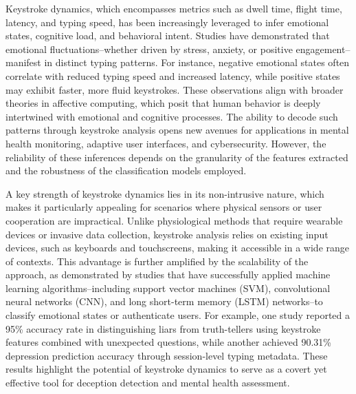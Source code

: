\documentclass[conference]{IEEEtran}
\begin{document}
Keystroke dynamics, which encompasses metrics such as dwell time, flight time, latency, and typing speed, has been increasingly leveraged to infer emotional states, cognitive load, and behavioral intent. Studies have demonstrated that emotional fluctuations--whether driven by stress, anxiety, or positive engagement--manifest in distinct typing patterns. For instance, negative emotional states often correlate with reduced typing speed and increased latency, while positive states may exhibit faster, more fluid keystrokes. These observations align with broader theories in affective computing, which posit that human behavior is deeply intertwined with emotional and cognitive processes. The ability to decode such patterns through keystroke analysis opens new avenues for applications in mental health monitoring, adaptive user interfaces, and cybersecurity. However, the reliability of these inferences depends on the granularity of the features extracted and the robustness of the classification models employed.  

A key strength of keystroke dynamics lies in its non-intrusive nature, which makes it particularly appealing for scenarios where physical sensors or user cooperation are impractical. Unlike physiological methods that require wearable devices or invasive data collection, keystroke analysis relies on existing input devices, such as keyboards and touchscreens, making it accessible in a wide range of contexts. This advantage is further amplified by the scalability of the approach, as demonstrated by studies that have successfully applied machine learning algorithms--including support vector machines (SVM), convolutional neural networks (CNN), and long short-term memory (LSTM) networks--to classify emotional states or authenticate users. For example, one study reported a 95\% accuracy rate in distinguishing liars from truth-tellers using keystroke features combined with unexpected questions, while another achieved 90.31\% depression prediction accuracy through session-level typing metadata. These results highlight the potential of keystroke dynamics to serve as a covert yet effective tool for deception detection and mental health assessment.  
\end{document}
